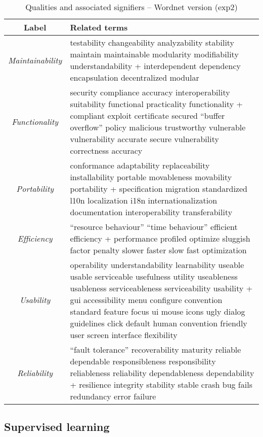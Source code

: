 \documentclass{acm_proc_article-sp}
\begin{document}
\begin{table*}[h]
	\caption{Qualities and associated signifiers – Wordnet version (\textsf{exp2})}
	\centering
	\label{tbl:wnsig}
\begin{tabular}{c|p{9cm}}
\toprule
\textbf{Label} & \textbf{Related terms} \\
\midrule
\emph{Maintainability} &
testability changeability analyzability stability maintain maintainable modularity modifiability understandability + interdependent dependency encapsulation decentralized modular\\ \hline
\emph{Functionality} &
security compliance accuracy interoperability suitability functional practicality functionality + compliant exploit certificate secured “buffer overflow” policy malicious trustworthy vulnerable vulnerability accurate secure vulnerability correctness accuracy\\ \hline
\emph{Portability} &
conformance adaptability replaceability installability portable movableness movability portability + specification migration standardized l10n localization i18n internationalization documentation interoperability transferability\\ \hline
\emph{Efficiency} &
“resource behaviour” “time behaviour” efficient efficiency + performance profiled optimize sluggish factor penalty slower faster slow fast optimization\\ \hline
\emph{Usability} &
operability understandability learnability useable usable serviceable usefulness utility useableness usableness serviceableness serviceability usability + gui accessibility menu configure convention standard feature focus ui mouse icons ugly dialog guidelines click default human convention friendly user screen interface flexibility\\ \hline
\emph{Reliability} &
“fault tolerance” recoverability maturity reliable dependable responsibleness responsibility reliableness reliability dependableness dependability + resilience integrity stability stable crash bug fails redundancy error failure\\ 
\bottomrule
\end{tabular}
\end{table*}

\subsection{Supervised learning}
\end{document}
